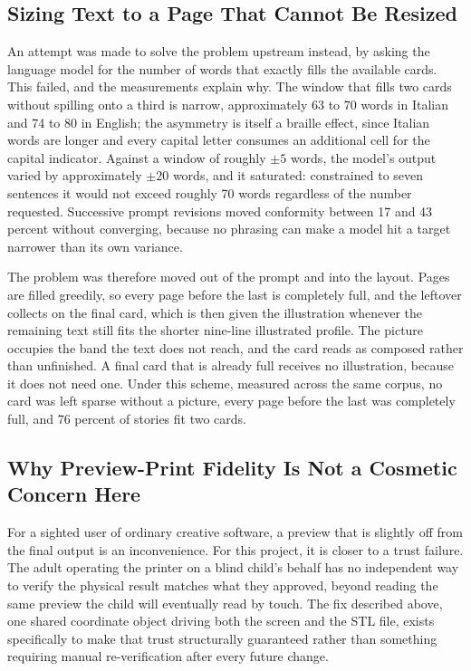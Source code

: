 \documentclass[conference]{IEEEtran}
\begin{document}
\subsection{Sizing Text to a Page That Cannot Be Resized}

An attempt was made to solve the problem upstream instead, by asking the language model for the number of words that exactly fills the available cards. This failed, and the measurements explain why. The window that fills two cards without spilling onto a third is narrow, approximately 63 to 70 words in Italian and 74 to 80 in English; the asymmetry is itself a braille effect, since Italian words are longer and every capital letter consumes an additional cell for the capital indicator. Against a window of roughly $\pm5$ words, the model's output varied by approximately $\pm20$ words, and it saturated: constrained to seven sentences it would not exceed roughly 70 words regardless of the number requested. Successive prompt revisions moved conformity between 17 and 43 percent without converging, because no phrasing can make a model hit a target narrower than its own variance.

The problem was therefore moved out of the prompt and into the layout. Pages are filled greedily, so every page before the last is completely full, and the leftover collects on the final card, which is then given the illustration whenever the remaining text still fits the shorter nine-line illustrated profile. The picture occupies the band the text does not reach, and the card reads as composed rather than unfinished. A final card that is already full receives no illustration, because it does not need one. Under this scheme, measured across the same corpus, no card was left sparse without a picture, every page before the last was completely full, and 76 percent of stories fit two cards.

\subsection{Why Preview-Print Fidelity Is Not a Cosmetic Concern Here}

For a sighted user of ordinary creative software, a preview that is slightly off from the final output is an inconvenience. For this project, it is closer to a trust failure. The adult operating the printer on a blind child's behalf has no independent way to verify the physical result matches what they approved, beyond reading the same preview the child will eventually read by touch. The fix described above, one shared coordinate object driving both the screen and the STL file, exists specifically to make that trust structurally guaranteed rather than something requiring manual re-verification after every future change.
\end{document}
